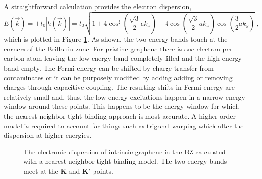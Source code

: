 A straightforward calculation provides the electron dispersion,
\begin{equation*}
	E(\vec{k})=\pm t_0 |h(\vec{k})|=t_0 \sqrt{1+4 \cos^2 \left(\frac{\sqrt{3}}{2} a k_x\right)
		+4 \cos\left(\frac{\sqrt{3}}{2} a k_x \right) \cos \left(\frac{3}{2} a k_y\right)} \ ,
\end{equation*}
which is plotted in Figure \ref{fig:TB:Dispersion}.
As shown, the two energy bands touch at the corners of the Brillouin zone.
For pristine graphene there is one electron per carbon atom leaving the low energy band completely filled and the high energy band empty.
The Fermi energy can be shifted by charge transfer from contaminates or it can be purposely modified by adding adding or removing charges through capacitive coupling.
The resulting shifts in Fermi energy are relatively small and, thus, the low energy excitations happen in a narrow energy window around these points.
This happens to be the energy window for which the nearest neighbor tight binding approach is most accurate.
A higher order model is required to account for things such as trigonal warping which alter the dispersion at higher energies.

\begin{figure}
	\begin{center}
	
	\end{center}
	\caption[The electronic dispersion of intrinsic graphene]{\label{fig:TB:Dispersion} The electronic dispersion of intrinsic graphene in the BZ calculated with a nearest neighbor tight binding model.  The two energy bands meet at the $\bm{K}$ and $\bm{K'}$ points.}	
\end{figure}

